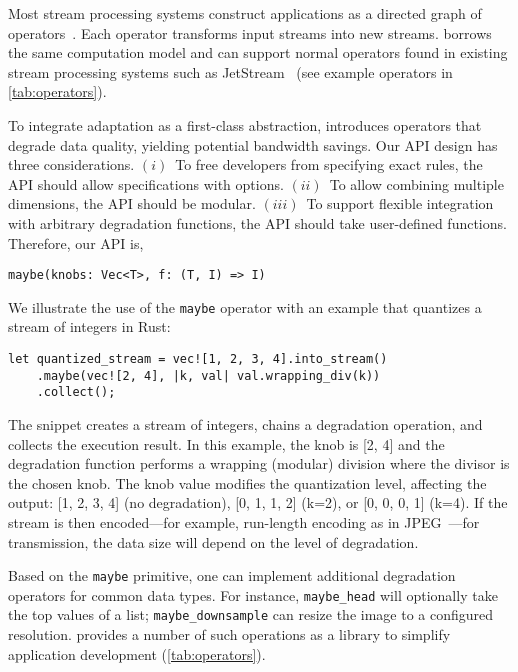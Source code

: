 Most stream processing systems construct applications as a directed graph of
operators~\cite{toshniwal2014storm, zaharia2013discretized}. Each operator
transforms input streams into new streams. \sysname{} borrows the same
computation model and can support normal operators found in existing stream
processing systems such as JetStream~\cite{rabkin2014aggregation} (see example
operators in \autoref{tab:operators}).

To integrate adaptation as a first-class abstraction, \sysname{} introduces
\maybe{} operators that degrade data quality, yielding potential bandwidth
savings.  Our API design has three considerations. $(i)$~To free developers from
specifying exact rules, the API should allow specifications with
options. $(ii)$~To allow combining multiple dimensions, the API should be
modular. $(iii)$~To support flexible integration with arbitrary degradation
functions, the API should take user-defined functions. Therefore, our API is,

\begin{lstlisting}[xleftmargin=.2\textwidth]
maybe(knobs: Vec<T>, f: (T, I) => I)
\end{lstlisting}

We illustrate the use of the \texttt{maybe} operator with an example that
quantizes a stream of integers in Rust:

\begin{lstlisting}[xleftmargin=.1\textwidth]
let quantized_stream = vec![1, 2, 3, 4].into_stream()
    .maybe(vec![2, 4], |k, val| val.wrapping_div(k))
    .collect();
\end{lstlisting}

The snippet creates a stream of integers, chains a degradation operation, and
collects the execution result. In this example, the knob is [2, 4] and the
degradation function performs a wrapping (modular) division where the divisor is
the chosen knob. The knob value modifies the quantization level, affecting the
output: [1, 2, 3, 4] (no degradation), [0, 1, 1, 2] (k=2), or [0, 0, 0, 1]
(k=4). If the stream is then encoded---for example, run-length encoding as in
JPEG~\cite{wallace1992jpeg}---for transmission, the data size will depend on the
level of degradation.

Based on the \texttt{maybe} primitive, one can implement additional degradation
operators for common data types. For instance, \texttt{maybe\_head} will
optionally take the top values of a list; \texttt{maybe\_downsample} can resize
the image to a configured resolution. \sysname{} provides a number of such
operations as a library to simplify application development
(\autoref{tab:operators}).

